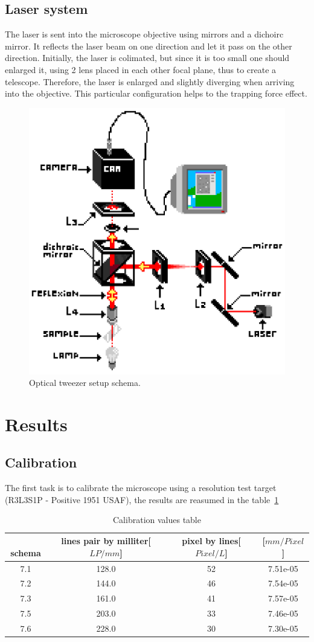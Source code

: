 \documentclass[a4paper,12pt,twoside]{article}	%
\begin{document}
\subsection{Laser system}
The laser is sent into the microscope objective using mirrors and a dichoirc mirror. It reflects the laser beam on one direction and let it pass on the other direction.
Initially, the laser is colimated, but since it is too small one should enlarged it, using 2 lens placed in each other focal plane, thus to create a telescope. Therefore, the laser is enlarged and slightly diverging when arriving into the objective. This particular configuration helps to the trapping force effect.

\begin{figure}[h]
	\begin{center}
		\includegraphics[width=0.6\linewidth,angle=0]{./figures/montage_1}
		\caption{Optical tweezer setup schema.} \label{fig:dispositif}
	\end{center}
\end{figure}

\section{Results}
\subsection{Calibration}
The first task is to calibrate the microscope using a resolution test target (R3L3S1P - Positive 1951 USAF), the results are reasumed in the table~\ref{tab:calibration}

\begin{table}[h!]
\centering
	\begin{tabular}{|c|c|c|c|}
		\hline
﻿		schema & lines pair by milliter[$LP/mm$]& pixel by lines[$Pixel/L$] & [$mm/Pixel$]\\
		\hline
		7.1	& 128.0	& 52 & 7.51e-05\\
		7.2	& 144.0	& 46 & 7.54e-05\\
		7.3	& 161.0	& 41 & 7.57e-05\\
		7.5	& 203.0	& 33 & 7.46e-05\\
		7.6	& 228.0	& 30 & 7.30e-05\\
		\hline
	\end{tabular}
	\caption{Calibration values table}
	\label{tab:calibration}
\end{table}
\end{document}
